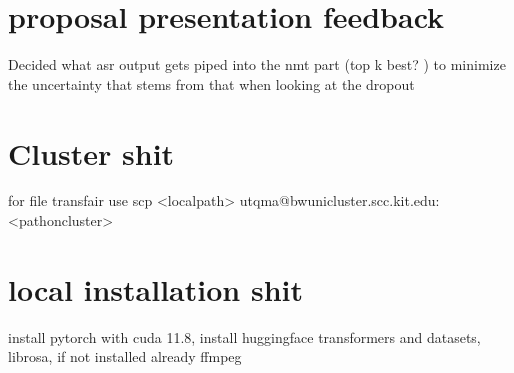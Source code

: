 \section{proposal presentation feedback}
Decided what asr output gets piped into the nmt part (top k best? ) to minimize the uncertainty that stems from that when looking at the dropout

\section{Cluster shit}

for file transfair use
scp <localpath> utqma@bwunicluster.scc.kit.edu:<pathoncluster>

\section{local installation shit}
install pytorch with cuda 11.8, install huggingface transformers and datasets, librosa, if not installed already ffmpeg 